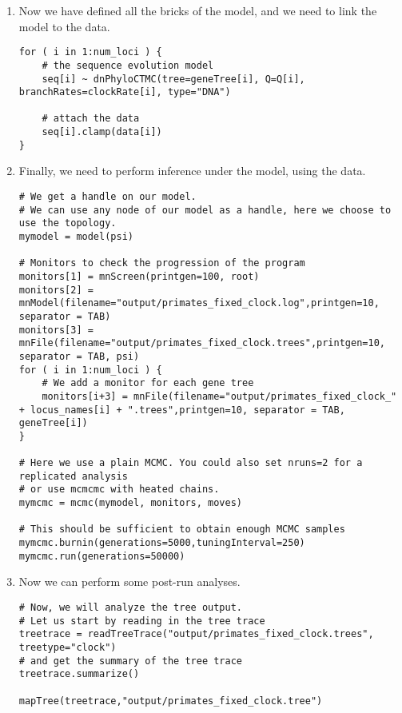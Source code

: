 \begin{enumerate}
{\begin{snugshade*}
\begin{lstlisting}
}

\end{lstlisting}
\end{snugshade*}}


\item Now we have defined all the bricks of the model, and we need to link the model to the data.
{\tt \begin{snugshade*}
\begin{lstlisting}
for ( i in 1:num_loci ) { 
    # the sequence evolution model
    seq[i] ~ dnPhyloCTMC(tree=geneTree[i], Q=Q[i], branchRates=clockRate[i], type="DNA")

    # attach the data
    seq[i].clamp(data[i])
}
\end{lstlisting}
\end{snugshade*}}

\item Finally, we need to perform inference under the model, using the data.
{\tt \begin{snugshade*}
\begin{lstlisting}
# We get a handle on our model.
# We can use any node of our model as a handle, here we choose to use the topology.
mymodel = model(psi)

# Monitors to check the progression of the program
monitors[1] = mnScreen(printgen=100, root)
monitors[2] = mnModel(filename="output/primates_fixed_clock.log",printgen=10, separator = TAB)
monitors[3] = mnFile(filename="output/primates_fixed_clock.trees",printgen=10, separator = TAB, psi)
for ( i in 1:num_loci ) { 
    # We add a monitor for each gene tree
    monitors[i+3] = mnFile(filename="output/primates_fixed_clock_" + locus_names[i] + ".trees",printgen=10, separator = TAB, geneTree[i])
}

# Here we use a plain MCMC. You could also set nruns=2 for a replicated analysis
# or use mcmcmc with heated chains.
mymcmc = mcmc(mymodel, monitors, moves)

# This should be sufficient to obtain enough MCMC samples
mymcmc.burnin(generations=5000,tuningInterval=250)
mymcmc.run(generations=50000)
\end{lstlisting}
\end{snugshade*}}

\item Now we can perform some post-run analyses.
{\tt \begin{snugshade*}
\begin{lstlisting}
# Now, we will analyze the tree output.
# Let us start by reading in the tree trace
treetrace = readTreeTrace("output/primates_fixed_clock.trees", treetype="clock")
# and get the summary of the tree trace
treetrace.summarize()

mapTree(treetrace,"output/primates_fixed_clock.tree")


\end{lstlisting}
\end{snugshade*}}

\end{enumerate}


